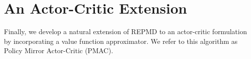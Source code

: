 


\section{An Actor-Critic Extension}
\label{subsec:repmd_value}



Finally, we develop a natural extension of REPMD to an actor-critic
formulation by incorporating a value function approximator.
We refer to this algorithm as Policy Mirror Actor-Critic (PMAC). 

